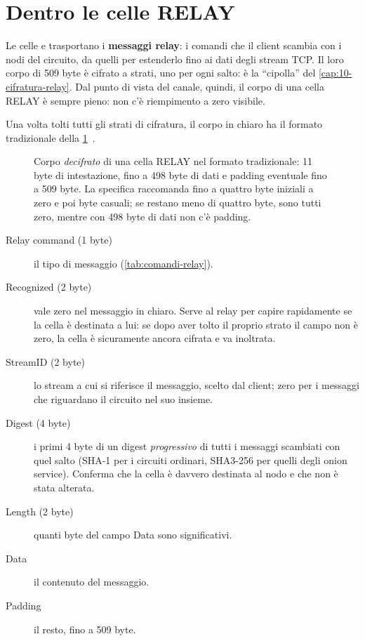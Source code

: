 \section{Dentro le celle RELAY}\label{sec:relay}

Le celle  e  trasportano i \textbf{messaggi relay}: i comandi che il client scambia con i nodi del circuito, da quelli per estenderlo fino ai dati degli stream TCP. Il loro corpo di 509 byte è cifrato a strati, uno per ogni salto: è la \enquote{cipolla} del \cref{cap:10-cifratura-relay}. Dal punto di vista del canale, quindi, il corpo di una cella RELAY è sempre pieno: non c'è riempimento a zero visibile.

Una volta tolti tutti gli strati di cifratura, il corpo in chiaro ha il formato tradizionale della \cref{fig:relay}~.

\begin{figure}[htbp]
\centering

\caption{Corpo \emph{decifrato} di una cella RELAY nel formato tradizionale: 11 byte di intestazione, fino a 498 byte di dati e padding eventuale fino a 509 byte. La specifica raccomanda fino a quattro byte iniziali a zero e poi byte casuali; se restano meno di quattro byte, sono tutti zero, mentre con 498 byte di dati non c'è padding.}
\label{fig:relay}
\end{figure}

\begin{description}
  \item[Relay command (1 byte)] il tipo di messaggio (\cref{tab:comandi-relay}).
  \item[Recognized (2 byte)] vale zero nel messaggio in chiaro. Serve al relay per capire rapidamente se la cella è destinata a lui: se dopo aver tolto il proprio strato il campo non è zero, la cella è sicuramente ancora cifrata e va inoltrata.
  \item[StreamID (2 byte)] lo stream a cui si riferisce il messaggio, scelto dal client; zero per i messaggi che riguardano il circuito nel suo insieme.
  \item[Digest (4 byte)] i primi 4 byte di un digest \emph{progressivo} di tutti i messaggi scambiati con quel salto (SHA-1 per i circuiti ordinari, SHA3-256 per quelli degli onion service). Conferma che la cella è davvero destinata al nodo e che non è stata alterata.
  \item[Length (2 byte)] quanti byte del campo Data sono significativi.
  \item[Data] il contenuto del messaggio.
  \item[Padding] il resto, fino a 509 byte.
\end{description}

